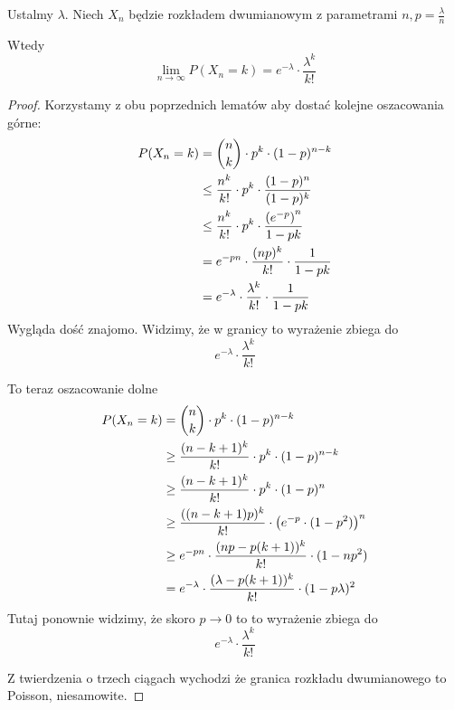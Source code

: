 \begin{theorem}[Twierdzenie 5.5 P\&C]
	Ustalmy \( \lambda \).
	Niech \( X_n \) będzie rozkładem dwumianowym z parametrami \( n,  p = \frac{\lambda}{n} \)

	Wtedy
	\[
		\lim_{n \rightarrow \infty} P(X_n = k) = e^{-\lambda} \cdot \frac{\lambda^k}{k!}
	\]
\end{theorem}
\begin{proof}
	Korzystamy z obu poprzednich lematów aby dostać kolejne oszacowania górne:
	\begin{align*}
		P(X_n = k)
		 & = \binom{n}{k} \cdot p^k \cdot (1-p)^{n-k}                         \\
		 & \leq \frac{n^k}{k!} \cdot p^k \cdot \frac{(1-p)^n}{(1-p)^k}        \\
		 & \leq \frac{n^k}{k!} \cdot p^k \cdot \frac{\left(e^{-p}\right)^n}{1 - pk} \\
		 & =e^{-pn}\cdot\frac{(np)^k}{k!}\cdot\frac{1}{1 - pk}                \\
		 & =e^{-\lambda} \cdot \frac{\lambda^k}{k!} \cdot \frac{1}{1 - pk}
	\end{align*}
	Wygląda dość znajomo. Widzimy, że w granicy to wyrażenie zbiega do
	\[
		e^{-\lambda} \cdot \frac{\lambda^k}{k!}
	\]

	To teraz oszacowanie dolne
	\begin{align*}
		P(X_n = k)
		 & = \binom{n}{k} \cdot p^k \cdot (1-p)^{n-k}                                    \\
		 & \geq \frac{(n - k + 1)^k}{k!} \cdot p^k \cdot (1-p)^{n - k}                   \\
		 & \geq \frac{(n - k + 1)^k}{k!} \cdot p^k \cdot (1-p)^n                         \\
		 & \geq \frac{((n-k+1)p)^k}{k!} \cdot \left(e^{-p}\cdot(1 - p^2)\right)^n              \\
		 & \geq e^{-pn} \cdot \frac{(np - p(k+1))^k}{k!} \cdot (1 - np^2)                \\
		 & = e^{-\lambda} \cdot \frac{(\lambda - p(k + 1))^k}{k!} \cdot (1 - p\lambda)^2
	\end{align*}
	Tutaj ponownie widzimy, że skoro \( p \rightarrow 0 \) to to wyrażenie zbiega do
	\[
		e^{-\lambda} \cdot \frac{\lambda^k}{k!}
	\]

	Z twierdzenia o trzech ciągach wychodzi że granica rozkładu dwumianowego to Poisson, niesamowite.
\end{proof}